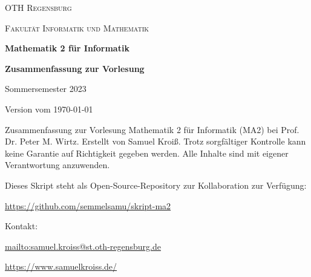\begin{titlepage}
    \centering
    {\textsc{OTH Regensburg} \par}
    {\textsc{Fakultät Informatik und Mathematik} \par}
    \vspace{8cm}
    {\huge\bfseries 
        Mathematik 2 für Informatik
    \par}
    \vspace{12pt}
    {\Large\bfseries 
        Zusammenfassung zur Vorlesung
    \par}
    \vspace{8cm}
    {\large Sommersemester 2023 \par Version vom \today\par}
    \vfill
    Zusammenfassung zur Vorlesung Mathematik 2 für Informatik (MA2) bei Prof. Dr. Peter M. Wirtz. Erstellt von Samuel Kroiß. Trotz sorgfältiger Kontrolle kann keine Garantie auf Richtigkeit gegeben werden. Alle Inhalte sind mit eigener Verantwortung anzuwenden.
\end{titlepage}

\thispagestyle{plain}
\footnotesize

Dieses Skript steht als Open-Source-Repository zur Kollaboration zur Verfügung:\par
\vspace{2pt}
\url{https://github.com/semmelsamu/skript-ma2}\par

\vspace{12pt}

Kontakt:\par
\vspace{1pt}
\url{mailto:samuel.kroiss@st.oth-regensburg.de}\par
\url{https://www.samuelkroiss.de/}